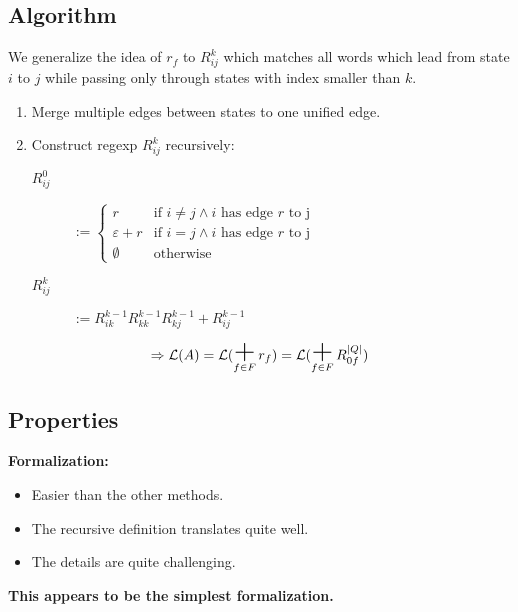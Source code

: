 \documentclass{beamer}
\DeclareMathOperator*{\bigplus}{\mbox{\huge +}}
\begin{document}
\subsection*{Algorithm}
\begin{frame}

    We generalize the idea of $r_f$ to $R^k_{i j}$ which matches all words which lead from state $i$ to $j$ while passing only through states with index smaller than $k$.

    \begin{enumerate}
        \item 
            Merge multiple edges between states to one unified edge.
        \item
            Construct regexp $R^k_{i j}$ recursively:

            \begin{description}

                \item[$R^0_{i j}$]
                    $ := \begin{cases} 
                        r & \mbox{if } i \neq j \wedge i \mbox{ has edge } r \mbox{ to j}  \\
          \varepsilon + r & \mbox{if } i = j \wedge i \mbox{ has edge } r \mbox{ to j}  \\
                \emptyset & \mbox{otherwise}
                    \end{cases}
                    $ 

                \item[$R^k_{i j}$]
                    $ := R^{k-1}_{i k} R^{k-1}_{k k} R^{k-1}_{k j} + R^{k-1}_{i j}$

            \end{description}

    \end{enumerate}

    \[ 
        \Rightarrow \mathcal{L}(A) = \mathcal{L}(\bigplus_{f \in F} r_f) = \mathcal{L}(\bigplus_{f \in F} R^{|Q|}_{0 f}) 
    \]

\end{frame}

\subsection*{Properties}
\begin{frame}
    \textbf{Formalization:} \\
    \begin{itemize}
        \item
            Easier than the other methods.\\
        \item
            The recursive definition translates quite well.\\
        \item
            The details are quite challenging.
    \end{itemize} 

    \pause

    {\centering 
        \textbf{This appears to be the simplest formalization.}

    }
\end{frame}
\end{document}
